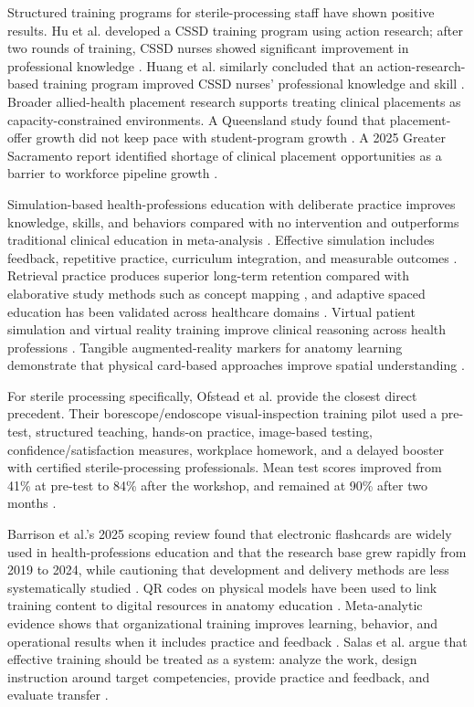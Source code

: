 \documentclass[10pt,a4paper]{article}
\begin{document}
Structured training programs for sterile-processing staff have shown positive results. Hu et al. developed a CSSD training program using action research; after two rounds of training, CSSD nurses showed significant improvement in professional knowledge \cite{hu-et-al-2024}. Huang et al. similarly concluded that an action-research-based training program improved CSSD nurses' professional knowledge and skill \cite{huang-et-al-2025}. Broader allied-health placement research supports treating clinical placements as capacity-constrained environments. A Queensland study found that placement-offer growth did not keep pace with student-program growth \cite{mcbride-et-al-2020}. A 2025 Greater Sacramento report identified shortage of clinical placement opportunities as a barrier to workforce pipeline growth \cite{north-greater-sacramento-coe-2025}.

Simulation-based health-professions education with deliberate practice improves knowledge, skills, and behaviors compared with no intervention and outperforms traditional clinical education in meta-analysis \cite{cook-et-al-2011, mcgaghie-et-al-2011}. Effective simulation includes feedback, repetitive practice, curriculum integration, and measurable outcomes \cite{issenberg-et-al-2005}. Retrieval practice produces superior long-term retention compared with elaborative study methods such as concept mapping \cite{karpicke-and-blunt-2011}, and adaptive spaced education has been validated across healthcare domains \cite{kerfoot-2010}. Virtual patient simulation and virtual reality training improve clinical reasoning across health professions \cite{kleinert-et-al-2015, wu-et-al-2022-virtual-simulation, jiang-et-al-2024-virtual-simulation, phanudulkitti-et-al-2023}. Tangible augmented-reality markers for anatomy learning demonstrate that physical card-based approaches improve spatial understanding \cite{bolek-et-al-2021}.

For sterile processing specifically, Ofstead et al. provide the closest direct precedent. Their borescope/endoscope visual-inspection training pilot used a pre-test, structured teaching, hands-on practice, image-based testing, confidence/satisfaction measures, workplace homework, and a delayed booster with certified sterile-processing professionals. Mean test scores improved from 41\% at pre-test to 84\% after the workshop, and remained at 90\% after two months \cite{ofstead-et-al-2023}.

Barrison et al.'s 2025 scoping review found that electronic flashcards are widely used in health-professions education and that the research base grew rapidly from 2019 to 2024, while cautioning that development and delivery methods are less systematically studied \cite{barrison-et-al-2025}. QR codes on physical models have been used to link training content to digital resources in anatomy education \cite{karia-et-al-2019}. Meta-analytic evidence shows that organizational training improves learning, behavior, and operational results when it includes practice and feedback \cite{arthur-et-al-2003}. Salas et al. argue that effective training should be treated as a system: analyze the work, design instruction around target competencies, provide practice and feedback, and evaluate transfer \cite{salas-et-al-2012}.
\end{document}
